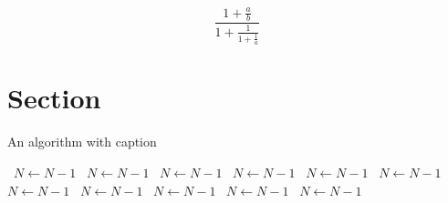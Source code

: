 \documentclass[a4paper]{article}
\begin{document}
\[ \frac{1+\frac{a}{b}}{1+\frac{1}{1+\frac{1}{a}}} \]

\section{Section}

\begin{algorithm}
\caption{An algorithm with caption}
\begin{algorithmic}
\    \State $N \gets N - 1$
\    \State $N \gets N - 1$
\    \State $N \gets N - 1$
\    \State $N \gets N - 1$
\    \State $N \gets N - 1$
\    \State $N \gets N - 1$
\    \State $N \gets N - 1$
\    \State $N \gets N - 1$
\    \State $N \gets N - 1$
\    \State $N \gets N - 1$
\    \State $N \gets N - 1$
\EndWhile
\end{algorithmic}
\end{algorithm}
\end{document}
